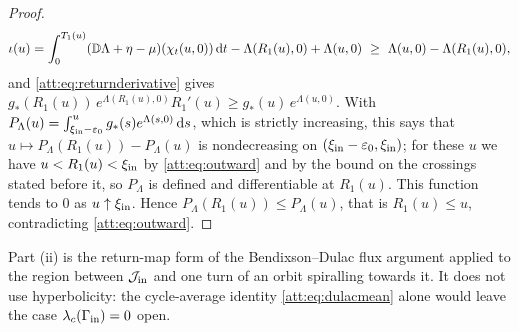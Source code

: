\begin{proof}
\[
\iota(u)=\int_0^{T_1(u)}(\Dt\Lambda+\eta-\mu)(\chi_t(u,0))\,\mathrm dt-\Lambda(R_1(u),0)+\Lambda(u,0)\ \ge\ \Lambda(u,0)-\Lambda(R_1(u),0),
\]
and \eqref{att:eq:returnderivative} gives $g_\ast(R_1(u))\,e^{\Lambda(R_1(u),0)}R_1'(u)\ge g_\ast(u)\,e^{\Lambda(u,0)}$. With $P_\Lambda(u)=\int_{\xi_{\rm in}-\varepsilon_0}^ug_\ast(s)e^{\Lambda(s,0)}\,\mathrm ds$, which is strictly increasing, this says that $u\mapsto P_\Lambda(R_1(u))-P_\Lambda(u)$ is nondecreasing on $(\xi_{\rm in}-\varepsilon_0,\xi_{\rm in})$; for these $u$ we have $u<R_1(u)<\xi_{\rm in}$ by \eqref{att:eq:outward} and by the bound on the crossings stated before it, so $P_\Lambda$ is defined and differentiable at $R_1(u)$. This function tends to $0$ as $u\uparrow\xi_{\rm in}$. Hence $P_\Lambda(R_1(u))\le P_\Lambda(u)$, that is $R_1(u)\le u$, contradicting \eqref{att:eq:outward}.
\end{proof}
Part (ii) is the return-map form of the Bendixson--Dulac flux argument applied to the region between $\mathcal J_{\rm in}$ and one turn of an orbit spiralling towards it. It does not use hyperbolicity: the cycle-average identity \eqref{att:eq:dulacmean} alone would leave the case $\lambda_c(\Gamma_{\rm in})=0$ open.

